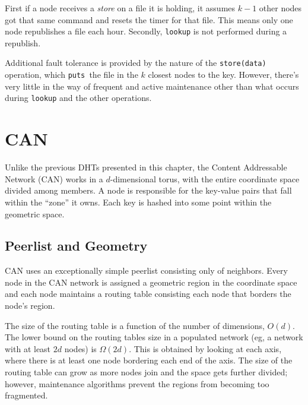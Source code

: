 \documentclass[10pt,letterpaper,twoside]{report}
\begin{document}
First if a node receives a \textit{store} on a file it is holding, it assumes $k-1$ other nodes got that same command and resets the timer for that file.
This means only one node republishes a file each hour.
Secondly, \texttt{lookup} is not performed during a republish.


Additional fault tolerance is provided by the nature of the \texttt{store(data)} operation, which \texttt{puts }the file in the $k$ closest nodes to the key.
However, there's very little in the way of frequent and active maintenance other than what occurs during \texttt{lookup} and the other operations.












\section{CAN}
Unlike the previous DHTs presented in this chapter, the Content Addressable Network (CAN) \cite{can} works in a $d$-dimensional torus, with the entire coordinate space divided among members.
A node is responsible for the key-value pairs that fall within the ``zone'' it owns.
Each key is hashed into some point within the geometric space.

\subsection*{Peerlist and Geometry}
CAN uses an exceptionally simple peerlist consisting only of neighbors.  
Every node in the CAN network is assigned a geometric region in the coordinate space and each node maintains a routing table consisting each node that borders the node's region.

The size of the routing table is a function of the number of dimensions, $O(d)$. 
The lower bound on the routing tables size in a populated network (eg, a network with at least $2d$ nodes) is $\Omega(2d)$.  
This is obtained by looking at each axis, where there is at least one node bordering each end of the axis.
The size of the routing table can grow as more nodes join and the space gets further divided; however, maintenance algorithms prevent the regions from becoming too fragmented.
\end{document}

